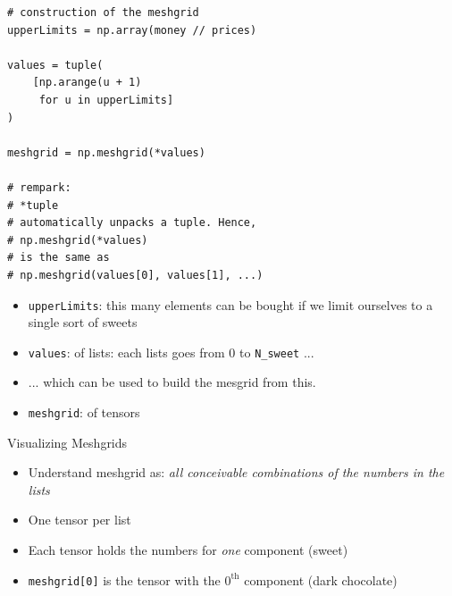 
\begin{frame}[fragile]
%
\begin{tcbraster}[raster columns=2,
                  raster equal height,
                  nobeforeafter,
                  raster column skip=0.5cm]
\begin{codebox}
\begin{verbatim}
# construction of the meshgrid
upperLimits = np.array(money // prices)

values = tuple(
    [np.arange(u + 1) 
     for u in upperLimits]
)

meshgrid = np.meshgrid(*values)

# rempark: 
# *tuple
# automatically unpacks a tuple. Hence,
# np.meshgrid(*values)
# is the same as
# np.meshgrid(values[0], values[1], ...)
\end{verbatim}
\end{codebox}
%
\begin{tcolorbox}[title=Elements in Code]
\begin{itemize}
\item \texttt{upperLimits}: this many elements can be bought if we limit ourselves to a single sort of sweets
\item \texttt{values}:  of lists: each lists goes from 0 to \texttt{N\_sweet} ...
\item ... which can be used to build the mesgrid from this.
\item \texttt{meshgrid}:  of tensors
\end{itemize}
\end{tcolorbox}
\end{tcbraster}
%
\end{frame}


\begin{frame}{Visualizing Meshgrids}
%
\begin{itemize}
\item Understand meshgrid as: \emph{all conceivable combinations of the numbers in the lists}
\item One tensor per list
\item Each tensor holds the numbers for \emph{one} component (\ie sweet)
\item \texttt{meshgrid[0]} is the tensor with the $0^{\text{th}}$ component (\ie dark chocolate)
\end{itemize}
%
\end{frame}

